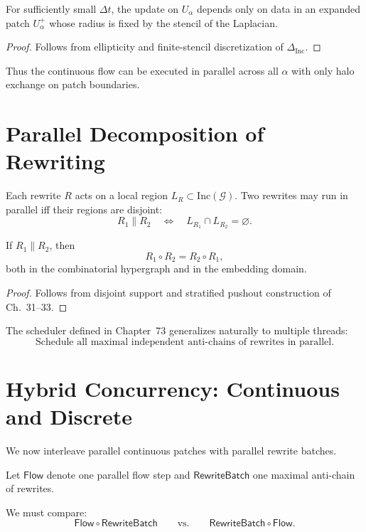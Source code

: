 \begin{theorem}
\label{thm:local-flow}
For sufficiently small $\Delta t$,  
the update on $U_\alpha$ depends only on data in an expanded patch
$U_\alpha^+$ whose radius is fixed by the stencil of the Laplacian.
\end{theorem}

\begin{proof}
Follows from ellipticity and finite-stencil discretization of $\Delta_{\mathrm{Inc}}$.
\end{proof}

Thus the continuous flow can be executed in parallel across all $\alpha$  
with only halo exchange on patch boundaries.

\section{Parallel Decomposition of Rewriting}

Each rewrite $R$ acts on a local region $L_R \subset \mathrm{Inc}(\mathcal{G})$.
Two rewrites may run in parallel iff their regions are disjoint:
\[
R_1 \parallel R_2 \quad\Longleftrightarrow\quad L_{R_1}\cap L_{R_2}=\varnothing.
\]

\begin{theorem}
\label{thm:rewrite-independence}
If $R_1 \parallel R_2$, then
\[
 R_1 \circ R_2 = R_2 \circ R_1,
\]
both in the combinatorial hypergraph and in the embedding domain.
\end{theorem}

\begin{proof}
Follows from disjoint support and stratified pushout construction of
Ch.~31--33.
\end{proof}

The scheduler defined in Chapter~73 generalizes naturally to multiple threads:
\[
\text{Schedule all maximal independent anti-chains of rewrites in parallel.}
\]

\section{Hybrid Concurrency: Continuous and Discrete}

We now interleave parallel continuous patches with parallel rewrite batches.

Let $\mathsf{Flow}$ denote one parallel flow step
and $\mathsf{RewriteBatch}$ one maximal anti-chain of rewrites.

We must compare:
\[
   \mathsf{Flow} \circ \mathsf{RewriteBatch}
   \qquad\text{vs.}\qquad
   \mathsf{RewriteBatch} \circ \mathsf{Flow}.
\]

